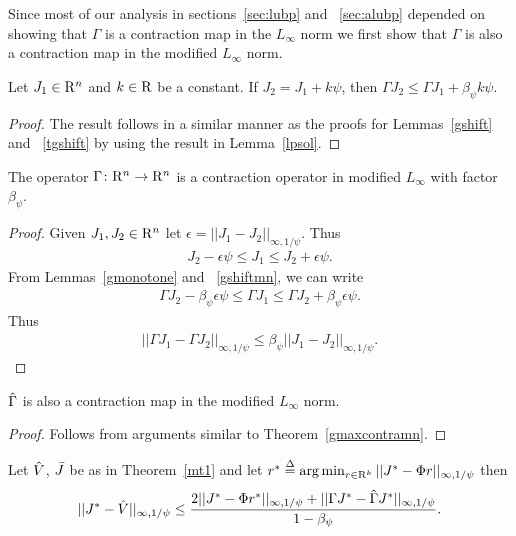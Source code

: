 Since most of our analysis in sections~\ref{sec:lubp} and ~\ref{sec:alubp} depended on showing that $\Gamma$ is a contraction map in the $L_\infty$ norm we first show that $\Gamma$ is also a contraction map in the modified $L_\infty$ norm.
\begin{lemma}\label{gshiftmn}
Let $J_1\in \mathrm{R}^n$ and $k\in \mathrm{R}$ be a constant. If $J_2=J_1+k\psi$, then $\Gamma J_2\leq \Gamma J_1+\beta_{\psi} k\psi$.
\end{lemma}
\begin{proof}
The result follows in a similar manner as the proofs for Lemmas~\ref{gshift} and ~\ref{tgshift} by using the result in Lemma~\ref{lpsol}.
\end{proof}
\begin{theorem}\label{gmaxcontramn}
The operator $\Gamma  \colon \mathrm{R}^n\rightarrow \mathrm{R}^n$ is a contraction operator in modified $L_\infty$ with factor $\beta_{\psi}$.
\end{theorem}
\begin{proof}
Given $J_1,J_2\in \mathrm{R}^n$ let $\epsilon=||J_1-J_2||_{\infty,1/\psi}$. Thus
\begin{align}\label{ineq}
J_2-\epsilon\psi\leq J_1\leq J_2+\epsilon \psi.
\end{align}
From Lemmas~\ref{gmonotone} and ~\ref{gshiftmn}, we can write
\begin{align}\label{ineq}
\Gamma J_2-\beta_{\psi} \epsilon\psi\leq \Gamma J_1\leq \Gamma J_2+\beta_{\psi} \epsilon\psi.
\end{align}
Thus
\begin{align}
||\Gamma J_1-\Gamma J_2||_{\infty,1/\psi}\leq \beta_{\psi} ||J_1-J_2||_{\infty,1/\psi}.
\end{align}
\end{proof}
\begin{corollary}\label{hgmaxcontramn}
$\hat{\Gamma}$ is also a contraction map in the modified $L_\infty$ norm.
\end{corollary}
\begin{proof}
Follows from arguments similar to Theorem~\ref{gmaxcontramn}.
\end{proof}
\begin{lemma}\label{cmt1mn}
Let $\hat{V}$, $\bar{J}$ be as in Theorem~\ref{mt1} and let $r^*\stackrel{\Delta}{=}\arg\min_{r\in \mathrm{R}^k}||J^*-\Phi r||_{\infty,1/\psi}$ then
\begin{align}
||J^*-\hat{V}||_{\infty,1/\psi}\leq \frac{2||J^*-\Phi r^*||_{\infty,1/\psi}+||\Gamma J^*-\hat{\Gamma} J^*||_{\infty,1/\psi}}{1-\beta_{\psi}}.
\end{align}
\end{lemma}
